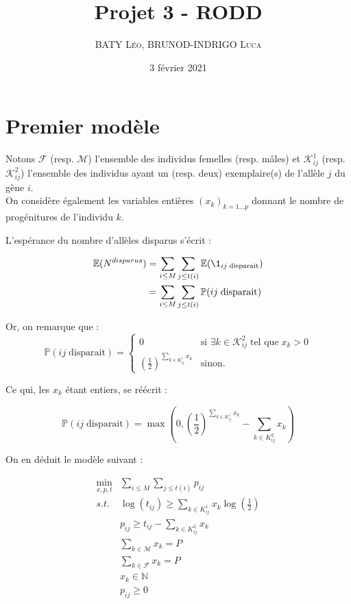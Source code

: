 \documentclass[12pt]{extarticle}
\title{Projet 3 -  RODD}
\date{3 février 2021}
\author{\textsc{BATY Léo}, \textsc{BRUNOD-INDRIGO Luca}}
\begin{document}
\maketitle

\section{Premier modèle}

Notons $\mathcal{F}$ (resp. $\mathcal{M}$) l'ensemble des individus femelles (resp. mâles) et $\mathcal{K}^1_{ij}$ (resp. $\mathcal{K}^2_{ij}$) l'ensemble des individus ayant un (resp. deux) exemplaire(s) de l'allèle $j$ du gène $i$.\\
On considère également les variables entières $(x_k)_{k=1 \dots p}$ donnant le nombre de progénitures de l'individu $k$.

\bigskip

L'espérance du nombre d'allèles disparus s'écrit : 

\begin{align*}
    \mathbb{E}(N^{disparus})    &= \sum_{i \leq M} \sum_{j \leq t(i)} \mathbb{E}(\1_{ij \; \text{disparait}}) \\
                                &= \sum_{i \leq M} \sum_{j \leq t(i)} \mathbb{P}(ij \; \text{disparait})
\end{align*}

Or, on remarque que : 
$$
\mathbb{P}(ij \; \text{disparait}) = \left\{
    \begin{array}{ll}
        0 & \mbox{si } \exists k \in \mathcal{K}^2_{ij} \; \mbox{tel que} \;  x_k > 0 \\
        \left(\frac{1}{2}\right)^{\sum_{k \in K_{ij}^1} x_k} & \mbox{sinon.}
    \end{array}
\right.
$$

Ce qui, les $x_k$ étant entiers, se réécrit : 

$$\mathbb{P}(ij \; \text{disparait}) = \max(0, \left(\frac{1}{2}\right)^{\sum_{k \in K_{ij}^1} x_k} - \sum_{k \in K_{ij}^2} x_k)$$

On en déduit le modèle suivant : 

\begin{align*}
    \min_{x, p, t} &\sum_{i \leq M} \sum_{j \leq t(i)} p_{ij}\\
    s.t.   & \log(t_{ij}) \geq \sum_{k \in K_{ij}^1} x_k \log\left(\frac{1}{2}\right)\\
           & p_{ij} \geq t_{ij} - \sum_{k \in K_{ij}^2} x_k\\
           & \sum_{k \in \mathcal{M}} x_k = P\\
           & \sum_{k \in \mathcal{F}} x_k = P\\
           & x_k \in \mathbb{N}\\
           & p_{ij} \geq 0
\end{align*}
\end{document}
